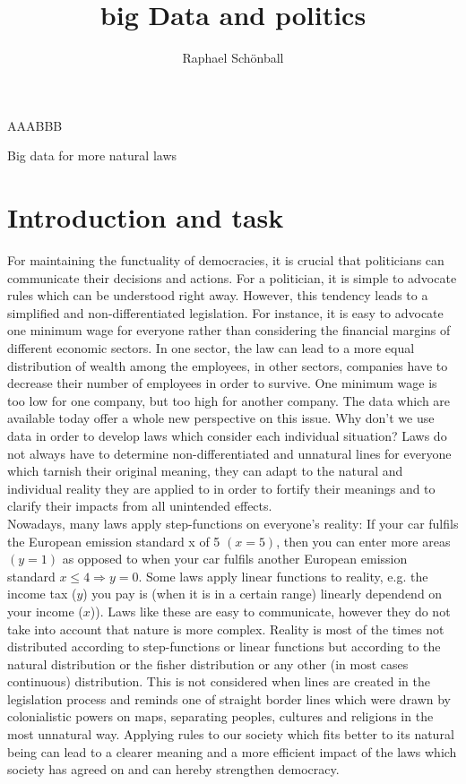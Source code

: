 \documentclass[12pt,a4paper]{article}
\author{Raphael Schönball}
\title{big Data and politics}
\begin{document}
	\begin{center}
	\begin{huge}
		AAABBB
	\end{huge}
	
	\begin{Large}
		Big data for more natural laws
	\end{Large}
	\end{center}
	
	\section{Introduction and task}
	
	For maintaining the functuality of democracies, it is crucial that politicians can communicate their decisions and actions. For a politician, it is simple to advocate rules which can be understood right away. However, this tendency leads to a simplified and non-differentiated legislation. For instance, it is easy to advocate one minimum wage for everyone rather than considering the financial margins of different economic sectors. In one sector, the law can lead to a more equal distribution of wealth among the employees, in other sectors, companies have to decrease their number of employees in order to survive. One minimum wage is too low for one company, but too high for another company. The data which are available today offer a whole new perspective on this issue. Why don't we use data in order to develop laws which consider each individual situation? Laws do not always have to determine non-differentiated and unnatural lines for everyone which tarnish their original meaning, they can adapt to the natural and individual reality they are applied to in order to fortify their meanings and to clarify their impacts from all unintended effects. \\
	Nowadays, many laws apply step-functions on everyone's reality: If your car fulfils the European emission standard x of 5 $(x=5)$, then you can enter more areas $(y=1)$ as opposed to when your car fulfils another European emission standard $x\leq4 \Rightarrow y=0$. Some laws apply linear functions to reality, e.g. the income tax ($y$) you pay is (when it is in a certain range) linearly dependend on your income ($x$)). Laws like these are easy to communicate, however they do not take into account that nature is more complex. Reality is most of the times not distributed according to step-functions or linear functions but according to the natural distribution or the fisher distribution or any other (in most cases continuous) distribution. This is not considered when lines are created in the legislation process and reminds one of straight border lines which were drawn by colonialistic powers on maps, separating peoples, cultures and religions in the most unnatural way. Applying rules to our society which fits better to its natural being can lead to a clearer meaning and a more efficient impact of the laws which society has agreed on and can hereby strengthen democracy.
	
\end{document}
